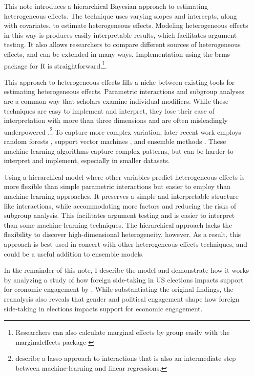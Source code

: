 \documentclass[12pt]{article}
\begin{document}

This note introduces a hierarchical Bayesian approach to estimating heterogeneous effects. 
The technique uses varying slopes and intercepts, along with covariates, to estimate heterogeneous effects. 
Modeling heterogeneous effects in this way is produces easily interpretable results, which facilitates argument testing. 
It also allows researchers to compare different sources of heterogeneous effects, and can be extended in many ways.  
Implementation using the brms package for \textsf{R} is straightforward.\footnote{Researchers can also calculate marginal effects by group easily with the marginaleffects package \citep{ArelBundockme}}. 


This approach to heterogeneous effects fills a niche between existing tools for estimating heterogeneous effects.
Parametric interactions and subgroup analyses are a common way that scholars examine individual modifiers. 
While these techniques are easy to implement and interpret, they lose their ease of interpretation with more than three dimensions and are often misleadingly underpowered \citep{Simmonsetal2011}.\footnote{\citet{BlackwellOlson2022} describe a lasso approach to interactions that is also an intermediate step between machine-learning and linear regressions.}
To capture more complex variation, later recent work employs random forests \citep{GreenKern2012, WagerAthey2018}, support vector machines \citep{ImaiRatkovic2013}, and ensemble methods \citep{Grimmeretal2017, Kuenzeletal2019, Dorieetal2022}.
These machine learning algorithms capture complex patterns, but can be harder to interpret and implement, especially in smaller datasets. 

 
 
Using a hierarchical model where other variables predict heterogeneous effects is more flexible than simple parametric interactions but easier to employ than machine learning approaches.  
It preserves a simple and interpretable structure like interactions, while accommodating more factors and reducing the risks of subgroup analysis. 
This facilitates argument testing and is easier to interpret than some machine-learning techniques.
The hierarchical approach lacks the flexibility to discover high-dimensional heterogeneity, however.  
As a result, this approach is best used in concert with other heterogeneous effects techniques, and could be a useful addition to ensemble models. 


In the remainder of this note, I describe the model and demonstrate how it works by analyzing a study of how foreign side-taking in US elections impacts support for economic engagement by \citet{BushPrather2020}.  
While substantiating the original findings, the reanalysis also reveals that gender and political engagement shape how foreign side-taking in elections impacts support for economic engagement.
\end{document}
